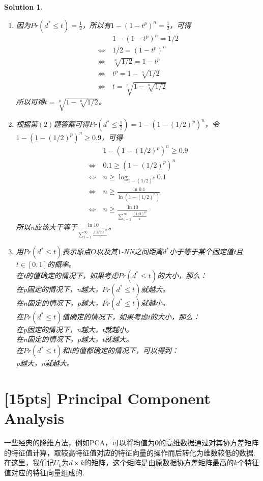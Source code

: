 \documentclass[a4paper,UTF8]{article}
\numberwithin{equation}{section}
\newtheorem*{mySol}{Solution}
\begin{document}
\begin{mySol}
\begin{enumerate}[(1)]
\item 
因为$Pr(d^*\leq t)=\frac{1}{2}$，所以有$1 - (1-t^p)^n = \frac{1}{2}$，可得
\begin{equation}
\begin{aligned}
&1 - (1-t^p)^n = 1/2\\
\Leftrightarrow\ &1/2 = (1-t^p)^n\\
\Leftrightarrow\ &\sqrt[n]{1/2} = 1-t^p\\
\Leftrightarrow\ &t^p = 1- \sqrt[n]{1/2}\\
\Leftrightarrow\ &t = \sqrt[p]{1- \sqrt[n]{1/2}}
\end{aligned}
\end{equation}
所以可得$t = \sqrt[p]{1- \sqrt[n]{1/2}}$。
\item 
根据第$(2)$题答案可得$Pr(d^* \leq \frac{1}{2}) = 1 - (1-(1/2)^p)^n$，令$1 - (1-(1/2)^p)^n \geq 0.9$，可得
\begin{equation}
\begin{aligned}
&1 - (1-(1/2)^p)^n \geq 0.9\\
\Leftrightarrow\ &0.1 \geq (1-(1/2)^p)^n\\
\Leftrightarrow\ &n \geq \log_{1-(1/2)^p}0.1\\
\Leftrightarrow\ &n \geq \frac{\ln 0.1}{\ln (1-(1/2)^p)}\\
\Leftrightarrow\ &n \geq \frac{\ln 10}{\sum_{i=1}^{\infty} \frac{(1/2)^{pi}}{i}}
\end{aligned}
\end{equation}
所以n应该大于等于$\frac{\ln 10}{\sum_{i=1}^{\infty} \frac{(1/2)^{pi}}{i}}$。
\item 
用$Pr(d^*\leq t)$表示原点$O$以及其$1$-NN之间距离$d^*$小于等于某个固定值t且$t\in [0,1]$的概率。\\
在t的值确定的情况下，如果考虑$Pr(d^*\leq t)$的大小，那么：\\
在p固定的情况下，n越大，$Pr(d^*\leq t)$就越大。\\
在n固定的情况下，p越大，$Pr(d^*\leq t)$就越小。\\
在$Pr(d^*\leq t)$值确定的情况下，如果考虑t的大小，那么：\\
在p固定的情况下，n越大，t就越小。\\
在n固定的情况下，p越大，t就越大。\\
在$Pr(d^*\leq t)$和t的值都确定的情况下，可以得到：\\
p越大，n就越大。
\end{enumerate}
\end{mySol}
\newpage

\section{[15pts] Principal Component Analysis}
一些经典的降维方法，例如PCA，可以将均值为$\mathbf{0}$的高维数据通过对其协方差矩阵的特征值计算，取较高特征值对应的特征向量的操作而后转化为维数较低的数据. 在这里，我们记$U_k$为$d\times k$的矩阵，这个矩阵是由原数据协方差矩阵最高的$k$个特征值对应的特征向量组成的. 
\end{document}
